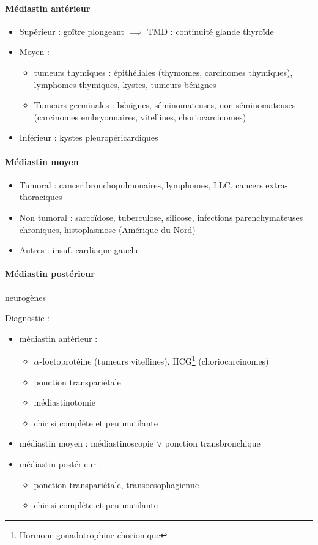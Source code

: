 \paragraph{Médiastin antérieur}
\begin{itemize}
  \item Supérieur : goître plongeant $\implies$ TMD : continuité glande thyroïde
  \item Moyen : 
    \begin{itemize}
      \item tumeurs thymiques : épithéliales (thymomes, carcinomes thymiques),
        lymphomes thymiques, kystes, tumeurs bénignes
      \item Tumeurs germinales : bénignes, séminomateuses, non séminomateuses
        (carcinomes embryonnaires, vitellines, choriocarcinomes)
    \end{itemize}
  \item Inférieur : kystes pleuropéricardiques
\end{itemize}

\paragraph{Médiastin moyen}
\begin{itemize}
  \item Tumoral : cancer bronchopulmonaires, lymphomes, LLC, cancers
    extra-thoraciques
  \item Non tumoral : sarcoïdose, tuberculose, silicose, infections
    parenchymateuses chroniques, histoplasmose (Amérique du Nord)
  \item Autres : insuf. cardiaque gauche
\end{itemize}

\paragraph{Médiastin postérieur} neurogènes

Diagnostic :
\begin{itemize}
  \item médiastin antérieur : 
    \begin{itemize}
      \item $\alpha$-foetoprotéine (tumeurs vitellines), HCG\footnote{Hormone gonadotrophine chorionique} (choriocarcinomes)
      \item ponction transpariétale
      \item médiastinotomie
      \item chir si complète et peu mutilante
    \end{itemize}
  \item médiastin moyen : médiastinoscopie $\vee$ ponction transbronchique
  \item médiastin postérieur : 
    \begin{itemize}
      \item ponction transpariétale, transoesophagienne
      \item chir si complète et peu mutilante
    \end{itemize}
\end{itemize}

